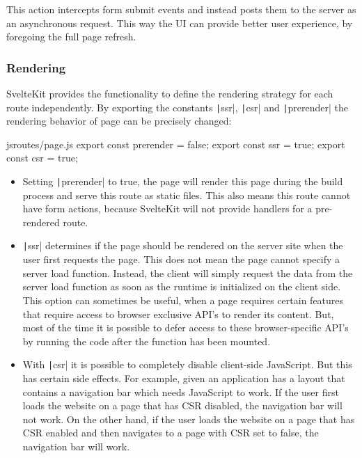 \s{$}

This action intercepts form submit events and instead posts them to the server as an asynchronous request. This way the UI can provide better user experience, by foregoing the full page refresh.

\subsubsection{Rendering}

SvelteKit provides the functionality to define the rendering strategy for each route independently.
By exporting the constants \texttt|ssr|, \texttt|csr| and \texttt|prerender| the rendering behavior of page can be precisely changed:
\begin{myminted}{js}{routes/page.js}
export const prerender = false;
export const ssr = true;
export const csr = true;
\end{myminted}

\begin{itemize}
    \item Setting \texttt|prerender| to true, the page will render this page during the build process and serve this route as static files. This also means this route cannot have form actions, because SvelteKit will not provide handlers for a pre-rendered route.
    \item \texttt|ssr| determines if the page should be rendered on the server site when the user first requests the page. This does not mean the page cannot specify a server load function. Instead, the client will simply request the data from the server load function as soon as the runtime is initialized on the client side. This option can sometimes be useful, when a page requires certain features that require access to browser exclusive API's to render its content. But, most of the time it is possible to defer access to these browser-specific API's by running the code after the function has been mounted.
    \item With \texttt|csr| it is possible to completely disable client-side JavaScript. But this has certain side effects. For example, given an application has a layout that contains a navigation bar which needs JavaScript to work. If the user first loads the website on a page that has CSR disabled, the navigation bar will not work. On the other hand, if the user loads the website on a page that has CSR enabled and then navigates to a page with CSR set to false, the navigation bar will work.
\end{itemize}